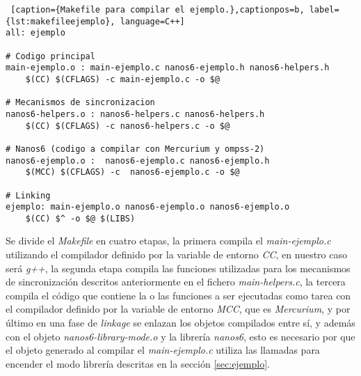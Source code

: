 \begin{lstlisting} [caption={Makefile para compilar el ejemplo.},captionpos=b, label={lst:makefileejemplo}, language=C++]                                                                                                                                               
all: ejemplo

# Codigo principal
main-ejemplo.o : main-ejemplo.c nanos6-ejemplo.h nanos6-helpers.h                                                                                                                                       
    $(CC) $(CFLAGS) -c main-ejemplo.c -o $@                                                                                                                                                                 

# Mecanismos de sincronizacion
nanos6-helpers.o : nanos6-helpers.c nanos6-helpers.h
    $(CC) $(CFLAGS) -c nanos6-helpers.c -o $@                                                                                                                                                                 

# Nanos6 (codigo a compilar con Mercurium y ompss-2)
nanos6-ejemplo.o :  nanos6-ejemplo.c nanos6-ejemplo.h
    $(MCC) $(CFLAGS) -c  nanos6-ejemplo.c -o $@                                                                                                                                                             

# Linking
ejemplo: main-ejemplo.o nanos6-ejemplo.o nanos6-ejemplo.o                                                                                                                                      
    $(CC) $^ -o $@ $(LIBS)                                                                                                                                                                                    
\end{lstlisting}

Se divide el \textit{Makefile} en cuatro etapas, la primera compila el \textit{main-ejemplo.c} utilizando el compilador definido por la variable de entorno \textit{CC}, en nuestro caso será \textit{g++}, la segunda etapa compila las funciones utilizadas para los mecanismos de sincronización descritos anteriormente en el fichero \textit{main-helpers.c}, la tercera compila el código que contiene la o las funciones a ser ejecutadas como tarea con el compilador definido por la variable de entorno \textit{MCC}, que es \textit{Mercurium}, y por último en una fase de \textit{linkage} se enlazan los objetos compilados entre sí, y además con el objeto \textit{nanos6-library-mode.o} y la librería \textit{nanos6}, esto es necesario por que el objeto generado al compilar el \textit{main-ejemplo.c} utiliza las llamadas para encender el modo librería descritas en la sección \ref{sec:ejemplo}.

